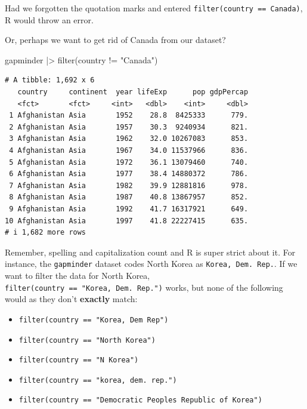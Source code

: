 \documentclass[
  letterpaper,
]{book}
\newenvironment{Shaded}{\begin{snugshade}}{\end{snugshade}}
\newcommand{\FunctionTok}[1]{\textcolor[rgb]{0.28,0.35,0.67}{#1}}
\newcommand{\NormalTok}[1]{\textcolor[rgb]{0.00,0.23,0.31}{#1}}
\newcommand{\SpecialCharTok}[1]{\textcolor[rgb]{0.37,0.37,0.37}{#1}}
\newcommand{\StringTok}[1]{\textcolor[rgb]{0.13,0.47,0.30}{#1}}
\providecommand{\tightlist}{%
  \setlength{\itemsep}{0pt}\setlength{\parskip}{0pt}}\usepackage{longtable,booktabs,array}
\begin{document}
Had we forgotten the quotation marks and entered
\texttt{filter(country\ ==\ Canada)}, R would throw an error.

Or, perhaps we want to get rid of Canada from our dataset?

\begin{Shaded}
\begin{Highlighting}[]
\NormalTok{gapminder }\SpecialCharTok{|\textgreater{}} 
  \FunctionTok{filter}\NormalTok{(country }\SpecialCharTok{!=} \StringTok{"Canada"}\NormalTok{)}
\end{Highlighting}
\end{Shaded}

\begin{verbatim}
# A tibble: 1,692 x 6
   country     continent  year lifeExp      pop gdpPercap
   <fct>       <fct>     <int>   <dbl>    <int>     <dbl>
 1 Afghanistan Asia       1952    28.8  8425333      779.
 2 Afghanistan Asia       1957    30.3  9240934      821.
 3 Afghanistan Asia       1962    32.0 10267083      853.
 4 Afghanistan Asia       1967    34.0 11537966      836.
 5 Afghanistan Asia       1972    36.1 13079460      740.
 6 Afghanistan Asia       1977    38.4 14880372      786.
 7 Afghanistan Asia       1982    39.9 12881816      978.
 8 Afghanistan Asia       1987    40.8 13867957      852.
 9 Afghanistan Asia       1992    41.7 16317921      649.
10 Afghanistan Asia       1997    41.8 22227415      635.
# i 1,682 more rows
\end{verbatim}

Remember, spelling and capitalization count and R is super strict about
it. For instance, the \texttt{gapminder} dataset codes North Korea as
\texttt{Korea,\ Dem.\ Rep.}. If we want to filter the data for North
Korea, \texttt{filter(country\ ==\ "Korea,\ Dem.\ Rep.")} works, but
none of the following would as they don't \textbf{exactly} match:

\begin{itemize}
\tightlist
\item
  \texttt{filter(country\ ==\ "Korea,\ Dem\ Rep")}
\item
  \texttt{filter(country\ ==\ "North\ Korea")}
\item
  \texttt{filter(country\ ==\ "N\ Korea")}
\item
  \texttt{filter(country\ ==\ "korea,\ dem.\ rep.")}
\item
  \texttt{filter(country\ ==\ "Democratic\ People\textquotesingle{}s\ Republic\ of\ Korea")}
\end{itemize}
\end{document}
